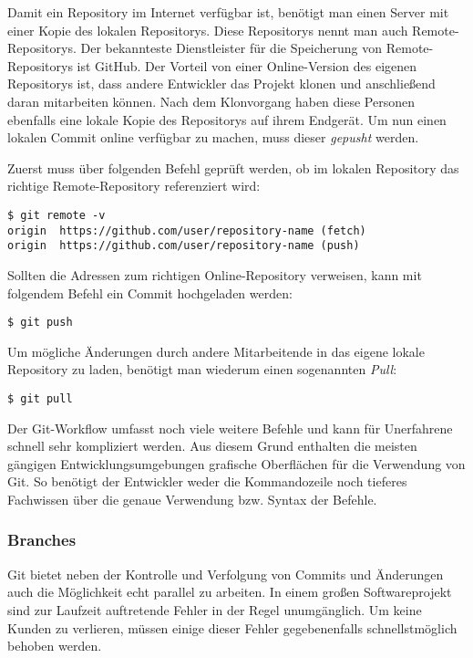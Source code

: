Damit ein Repository im Internet verfügbar ist, benötigt man einen Server mit
einer Kopie des lokalen Repositorys. Diese Repositorys nennt man auch
Remote-Repositorys. Der bekannteste Dienstleister für die Speicherung
von Remote-Repositorys ist GitHub. Der Vorteil von einer Online-Version des
eigenen Repositorys ist, dass andere Entwickler das Projekt klonen und
anschließend daran mitarbeiten können. Nach dem Klonvorgang haben diese Personen
ebenfalls eine lokale Kopie des Repositorys auf ihrem Endgerät. Um nun einen
lokalen Commit online verfügbar zu machen, muss dieser \emph{gepusht} werden.

Zuerst muss über folgenden Befehl geprüft werden, ob im lokalen Repository das
richtige Remote-Repository referenziert wird:

\begin{lstlisting}[style=Bash]
$ git remote -v
origin	https://github.com/user/repository-name (fetch)
origin	https://github.com/user/repository-name (push)
\end{lstlisting}

Sollten die Adressen zum richtigen Online-Repository verweisen, kann mit
folgendem Befehl ein Commit hochgeladen werden:

\begin{lstlisting}[style=Bash]
$ git push
\end{lstlisting}

\newpage

Um mögliche Änderungen durch andere Mitarbeitende in das eigene lokale
Repository zu laden, benötigt man wiederum einen sogenannten \emph{Pull}:

\begin{lstlisting}[style=Bash]
$ git pull
\end{lstlisting}

Der Git-Workflow umfasst noch viele weitere Befehle und kann für Unerfahrene
schnell sehr kompliziert werden. Aus diesem Grund enthalten die meisten gängigen
Entwicklungsumgebungen grafische Oberflächen für die Verwendung von Git. So
benötigt der Entwickler weder die Kommandozeile noch tieferes Fachwissen über
die genaue Verwendung bzw. Syntax der Befehle.

\subsubsection{Branches}
Git bietet neben der Kontrolle und Verfolgung von Commits und Änderungen auch
die Möglichkeit echt parallel zu arbeiten. In einem großen Softwareprojekt sind
zur Laufzeit auftretende Fehler in der Regel unumgänglich. Um keine Kunden zu
verlieren, müssen einige dieser Fehler gegebenenfalls schnellstmöglich behoben
werden.

